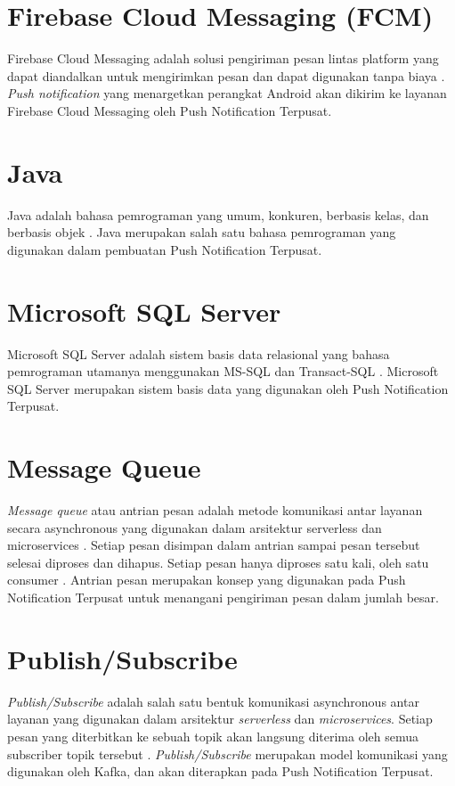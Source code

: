 \section{Firebase Cloud Messaging (FCM)}
\par Firebase Cloud Messaging adalah solusi pengiriman pesan lintas platform yang dapat diandalkan untuk mengirimkan pesan dan dapat digunakan tanpa biaya \cite{fcm-online}. \textit{Push notification} yang menargetkan perangkat Android akan dikirim ke layanan Firebase Cloud Messaging oleh Push Notification Terpusat.

\section{Java}
\par Java adalah bahasa pemrograman yang umum, konkuren, berbasis kelas, dan berbasis objek \cite{java-online}. Java merupakan salah satu bahasa pemrograman yang digunakan dalam pembuatan Push Notification Terpusat.

\section{Microsoft SQL Server}
\par Microsoft SQL Server adalah sistem basis data relasional yang bahasa pemrograman utamanya menggunakan MS-SQL dan Transact-SQL \cite{sqlserver-thesis}. Microsoft SQL Server merupakan sistem basis data yang digunakan oleh Push Notification Terpusat.

\section{Message Queue}
\par \textit{Message queue} atau antrian pesan adalah metode komunikasi antar layanan secara asynchronous yang digunakan dalam arsitektur serverless dan microservices \cite{message-queue-online}. Setiap pesan disimpan dalam antrian sampai pesan tersebut selesai diproses dan dihapus. Setiap pesan hanya diproses satu kali, oleh satu consumer \cite{message-queue-online}. Antrian pesan merupakan konsep yang digunakan pada Push Notification Terpusat untuk menangani pengiriman pesan dalam jumlah besar.

\section{Publish/Subscribe}
\par \textit{Publish/Subscribe} adalah salah satu bentuk komunikasi asynchronous antar layanan yang digunakan dalam arsitektur \textit{serverless} dan \textit{microservices}. Setiap pesan yang diterbitkan ke sebuah topik akan langsung diterima oleh semua subscriber topik tersebut \cite{publish-subscribe-online}. \textit{Publish/Subscribe} merupakan model komunikasi yang digunakan oleh Kafka, dan akan diterapkan pada Push Notification Terpusat.

